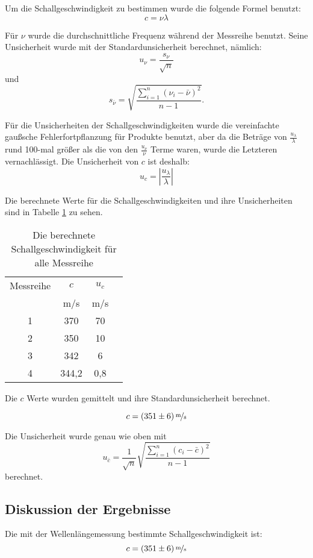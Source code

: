 \documentclass[11pt,a4paper]{article}
\begin{document}
Um die Schallgeschwindigkeit zu bestimmen wurde die folgende Formel benutzt:
$$ c = \nu\lambda$$

Für $\nu$ wurde die durchschnittliche Frequenz während der Messreihe benutzt. Seine Unsicherheit wurde mit der Standardunsicherheit berechnet, nämlich:
$$ u_\nu = \frac{s_\nu}{\sqrt{n}}$$
und
$$ s_{\bar{\nu}} = \sqrt{\frac{\sum_{i=1}^{n}(\nu_i-\bar{\nu})^2}{n-1}}.$$

Für die Unsicherheiten der Schallgeschwindigkeiten wurde die vereinfachte gaußsche Fehlerfortpflanzung für Produkte benutzt, aber da die Beträge von $\frac{u_\lambda}{\lambda}$ rund 100-mal größer als die von den $\frac{u_\nu}{\nu}$ Terme waren, wurde die Letzteren vernachlässigt. Die Unsicherheit von $c$ ist deshalb:
$$ u_c = \left| \frac{u_\lambda}{\lambda}\right|$$

Die berechnete Werte für die Schallgeschwindigkeiten und ihre Unsicherheiten sind in Tabelle \ref{Table2} zu sehen.

\begin{table}[h]
	\centering
	\begin{tabular*}{0.50\textwidth}{@{\extracolsep{\fill}}cccc}
		\toprule
		Messreihe & $c$ & $u_c$ \\
		& m/s&m/s\\
		1 & 370 & 70 \\
		2 & 350 & 10 \\
		3 & 342 & 6 \\
		4 & 344,2 & 0,8 \\
		\bottomrule
	\end{tabular*}
	\caption{Die berechnete Schallgeschwindigkeit für alle Messreihe}
\label{Table2}
\end{table}

Die $c$ Werte wurden gemittelt und ihre Standardunsicherheit berechnet. 

$$ c = (351 \pm 6)\,\nicefrac{\mathrm{m}}{\mathrm{s}}$$

Die Unsicherheit wurde genau wie oben mit
$$u_{\bar{c}} = \frac{1}{\sqrt{n}} \sqrt{\frac{\sum_{i=1}^{n}(c_i-\bar{c})^2}{n-1}}$$
berechnet. 




\subsection{Diskussion der Ergebnisse}


Die mit der Wellenlängemessung bestimmte Schallgeschwindigkeit ist:
$$ c = (351 \pm 6)\,\nicefrac{\mathrm{m}}{\mathrm{s}}$$
\end{document}

